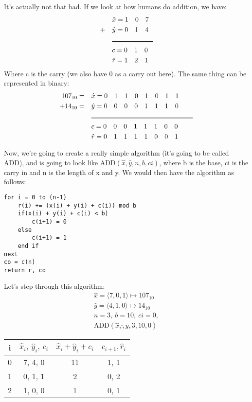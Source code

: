 \documentclass[11pt,a4paper,titlepage,dvipsnames,cmyk]{scrartcl}
\begin{document}
It's actually not that bad. If we look at how humans do addition, we have:
\begin{align*}
    &\hat x = 1 \quad 0 \quad 7 \\
    + \quad &\hat y = 0 \quad 1 \quad 4 \\
        &\rule{60pt}{1pt} \\
           &c = 0 \quad 1 \quad 0 \\
           &\hat r = 1 \quad 2 \quad 1
\end{align*}
Where c is the carry (we also have 0 as a carry out here). The same thing can be
represented in binary:
\begin{align*}
    107_{10} = \quad &\hat x = 0 \quad 1 \quad 1 \quad 0 \quad 1 \quad 0 \quad 1 \quad
    1 \\
    + 14_{10} = \quad &\hat y = 0 \quad 0 \quad 0 \quad 0 \quad 1 \quad 1 \quad 1
    \quad 0 \\
      &\rule{150pt}{1pt} \\
      &c = 0 \quad 0 \quad 0 \quad 1 \quad 1 \quad 1 \quad 0 \quad 0 \\
      &\hat r = 0 \quad 1 \quad 1 \quad 1 \quad 1 \quad 0 \quad 0 \quad 1
\end{align*}

Now, we're going to create a really simple algorithm (it's going to be called
ADD), and is going to look like $\text{ADD}(\hat x, \hat y, n, b, ci)$, where b
is the base, ci is the carry in and n is the length of x and y. We would then
have the algorithm as follows:
\begin{lstlisting}[style=B]
for i = 0 to (n-1)
    r(i) += (x(i) + y(i) + c(i)) mod b
    if(x(i) + y(i) + c(i) < b)
        c(i+1) = 0
    else
        c(i+1) = 1
    end if
next
co = c(n)
return r, co
\end{lstlisting}

Let's step through this algorithm:
\begin{gather*}
    \hat x = \langle 7, 0, 1 \rangle \mapsto 107_{10} \\
    \hat y = \langle 4, 1, 0 \rangle \mapsto 14_{10} \\
    n = 3, \ b = 10, \ ci = 0, \\
    \text{ADD}(\hat x, \hat, y, 3, 10, 0)
\end{gather*}

\begin{center}
    \begin{tabular}{|c|c|c|c|}
        \hline
        i & $\hat x_i, \ \hat y_i, \ c_i$ & $\hat x_i + \hat y_i + c_i$ &
        $c_{i+1}, \hat r_i$\\
        \hline
        0 & 7, 4, 0 & 11 & 1, 1 \\
        \hline
        1 & 0, 1, 1 & 2 & 0, 2 \\
        \hline
        2 & 1, 0, 0 & 1 & 0, 1 \\
        \hline
    \end{tabular}
\end{center}
\end{document}
